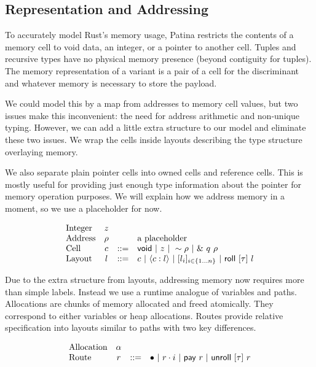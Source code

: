 \subsection*{Representation and Addressing}

To accurately model Rust's memory usage, Patina restricts
the contents of a memory cell to void data, an integer, or a pointer to another cell.
Tuples and recursive types have no physical memory presence (beyond contiguity for tuples).
The memory representation of a variant is a pair of a cell for the discriminant
and whatever memory is necessary to store the payload.

We could model this by a map from addresses to memory cell values,
but two issues make this inconvenient: the need for address arithmetic
and non-unique typing. However, we can add a little extra structure to
our model and eliminate these two issues. We wrap the cells inside
layouts describing the type structure overlaying memory.

We also separate plain pointer cells into owned cells and reference cells.
This is mostly useful for providing just enough type information about the pointer
for memory operation purposes. We will explain how we address memory in a moment,
so we use a placeholder for now.

\[
\begin{array}{lccl}
\textrm{Integer} & z & & \\
\textrm{Address} & \rho & & \textrm{a placeholder} \\
\textrm{Cell} & c & ::= & \mathsf{void} ~|~ z ~|~ \sim{\rho} ~|~ \&~{q~\rho} \\
\textrm{Layout} & l & ::= & c ~|~ \langle{{c}:{l}}\rangle ~|~ 
			       [{{l}_{i}}]_{{i} \in \{1 \ldots {n}\} } ~|~ \mathsf{roll}~[{\tau}]~{l} \\
\end{array}
\]

Due to the extra structure from layouts, addressing memory now requires
more than simple labels. Instead we use a runtime analogue of variables and paths.
Allocations are chunks of memory allocated and freed atomically.
They correspond to either variables or heap allocations.
Routes provide relative specification into layouts similar to paths with two key differences.

\[
\begin{array}{lccl}
\textrm{Allocation} & \alpha & & \\
\textrm{Route} & r & ::= & \bullet ~|~ {r}\cdot{i} ~|~ \mathsf{pay}~{r} ~|~ \mathsf{unroll}~[{\tau}]~{r} \\
\end{array}
\]

